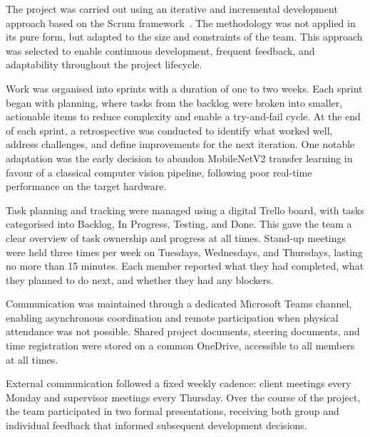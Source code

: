\label{sec:methodology}

The project was carried out using an iterative and incremental development approach
based on the Scrum framework~\cite{schwaber2020scrum}. The methodology was not applied
in its pure form, but adapted to the size and constraints of the team. This approach
was selected to enable continuous development, frequent feedback, and adaptability
throughout the project lifecycle.

Work was organised into sprints with a duration of one to two weeks. Each sprint
began with planning, where tasks from the backlog were broken into smaller,
actionable items to reduce complexity and enable a try-and-fail cycle. At the end
of each sprint, a retrospective was conducted to identify what worked well, address
challenges, and define improvements for the next iteration. One notable adaptation
was the early decision to abandon MobileNetV2 transfer learning in favour of a
classical computer vision pipeline, following poor real-time performance on the
target hardware.

Task planning and tracking were managed using a digital Trello board, with tasks
categorised into Backlog, In Progress, Testing, and Done. This gave the team a
clear overview of task ownership and progress at all times. Stand-up meetings were
held three times per week on Tuesdays, Wednesdays, and Thursdays, lasting no more
than 15 minutes. Each member reported what they had completed, what they planned to
do next, and whether they had any blockers.

Communication was maintained through a dedicated Microsoft Teams channel, enabling
asynchronous coordination and remote participation when physical attendance was not
possible. Shared project documents, steering documents, and time registration were
stored on a common OneDrive, accessible to all members at all times.

External communication followed a fixed weekly cadence: client meetings every
Monday and supervisor meetings every Thursday. Over the course of the project, the
team participated in two formal presentations, receiving both group and individual
feedback that informed subsequent development decisions.
